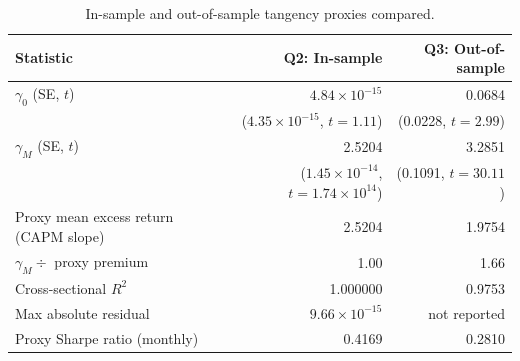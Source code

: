 \documentclass[11pt]{article}
\begin{document}
\begin{table}[H]
\centering
\caption{In-sample and out-of-sample tangency proxies compared.}
\small
\begin{tabular}{lrr}
\toprule
Statistic & Q2: In-sample & Q3: Out-of-sample \\
\midrule
$\gamma_0$ (SE, $t$) & $4.84\times10^{-15}$ & 0.0684 \\
 & ($4.35\times10^{-15}$, $t = 1.11$) & (0.0228, $t = 2.99$) \\
$\gamma_M$ (SE, $t$) & 2.5204 & 3.2851 \\
 & ($1.45\times10^{-14}$, $t = 1.74\times10^{14}$) & (0.1091, $t = 30.11$) \\
Proxy mean excess return (CAPM slope) & 2.5204 & 1.9754 \\
$\gamma_M \div$ proxy premium & 1.00 & 1.66 \\
Cross-sectional $R^2$ & 1.000000 & 0.9753 \\
Max absolute residual & $9.66\times10^{-15}$ & not reported \\
Proxy Sharpe ratio (monthly) & 0.4169 & 0.2810 \\
\bottomrule
\end{tabular}
\label{tab:p2q4}
\end{table}
\end{document}
